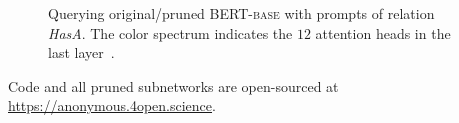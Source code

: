 \begin{figure}[t]
	\centering
	\caption{Querying original/pruned \textsc{BERT-base} with prompts of relation \textit{HasA}. The color spectrum indicates the $12$ attention heads in the last layer~\citep{DBLP:journals/corr/abs-1904-02679}.} \label{fig:LAMA}
\end{figure}



Code and all pruned subnetworks are open-sourced at \url{https://anonymous.4open.science}.
